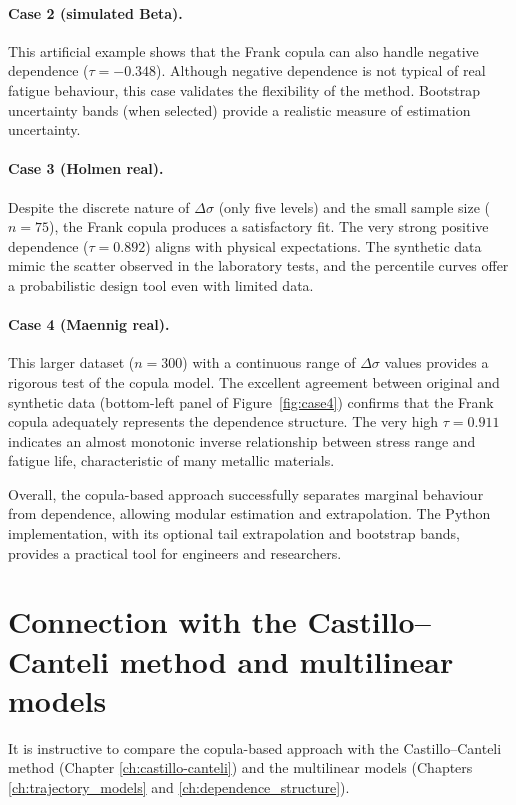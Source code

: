 \paragraph{Case 2 (simulated Beta).} This artificial example shows that the Frank copula can also handle negative dependence (\(\tau = -0.348\)). Although negative dependence is not typical of real fatigue behaviour, this case validates the flexibility of the method. Bootstrap uncertainty bands (when selected) provide a realistic measure of estimation uncertainty.

\paragraph{Case 3 (Holmen real).} Despite the discrete nature of \(\Delta\sigma\) (only five levels) and the small sample size (\(n = 75\)), the Frank copula produces a satisfactory fit. The very strong positive dependence (\(\tau = 0.892\)) aligns with physical expectations. The synthetic data mimic the scatter observed in the laboratory tests, and the percentile curves offer a probabilistic design tool even with limited data.

\paragraph{Case 4 (Maennig real).} This larger dataset (\(n = 300\)) with a continuous range of \(\Delta\sigma\) values provides a rigorous test of the copula model. The excellent agreement between original and synthetic data (bottom-left panel of Figure~\ref{fig:case4}) confirms that the Frank copula adequately represents the dependence structure. The very high \(\tau = 0.911\) indicates an almost monotonic inverse relationship between stress range and fatigue life, characteristic of many metallic materials.

Overall, the copula-based approach successfully separates marginal behaviour from dependence, allowing modular estimation and extrapolation. The Python implementation, with its optional tail extrapolation and bootstrap bands, provides a practical tool for engineers and researchers.

\section{Connection with the Castillo–Canteli method and multilinear models}
\label{sec:connection-cc}

It is instructive to compare the copula-based approach with the Castillo–Canteli method (Chapter \ref{ch:castillo-canteli}) and the multilinear models (Chapters \ref{ch:trajectory_models} and \ref{ch:dependence_structure}).

